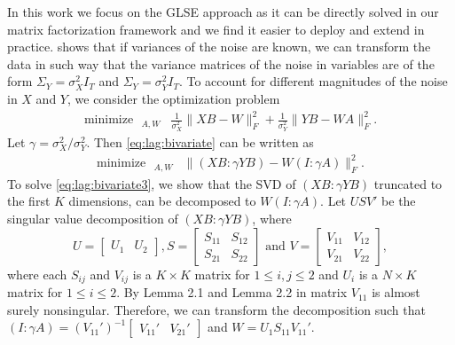\documentclass[preprint]{imsart}
\numberwithin{equation}{section}
\theoremstyle{plain}
\DeclareMathOperator*{\rank}{rank}
\DeclareMathOperator*{\minimize}{minimize\ \ }
\DeclareMathOperator*{\subjectto}{subject\ to\ \ }
\begin{document}
In this work we focus on the GLSE approach as it can be directly solved in our matrix factorization framework and we find it easier to deploy and extend in practice. \cite{gleser1981estimation} shows that if variances of the noise are known, we can transform the data in such way that the variance matrices of the noise in variables are of the form $\Sigma_Y = \sigma^2_XI_T$ and $\Sigma_Y = \sigma^2_YI_T$. To account for different magnitudes of the noise in $X$ and $Y$, we consider the optimization problem
\begin{align}\label{eq:lag:bivariate}
  \minimize_{A,W} & \frac{1}{\sigma_X^2}\|XB - W \|_F^2 + \frac{1}{\sigma_Y^2} \| YB - WA \|_F^2.
\end{align}
Let $\gamma = \sigma_X^2 / \sigma_Y^2$. Then \eqref{eq:lag:bivariate} can be written as
\begin{align}\label{eq:lag:bivariate3}
  \minimize_{A,W} & \| (XB : \gamma YB) - W(I: \gamma A) \|_F^2.%
\end{align}
To solve \eqref{eq:lag:bivariate3}, we show that the SVD of $(XB : \gamma YB)$ truncated to the first $K$ dimensions, can be decomposed to $W(I: \gamma A)$. Let $USV'$ be the singular value decomposition of $(XB : \gamma YB)$, where
\[
U = \begin{bmatrix}
  U_1 & U_2
\end{bmatrix},
S = \begin{bmatrix}
      S_{11} & S_{12}\\
      S_{21} & S_{22}
\end{bmatrix} 
\text{ and }
V = \begin{bmatrix}
      V_{11} & V_{12}\\
      V_{21} & V_{22}
    \end{bmatrix},
\]
where each $S_{ij}$ and $V_{ij}$ is a $K\times K$ matrix for $1 \leq i,j \leq 2$ and $U_i$ is a $N \times K$ matrix for $1 \leq i \leq 2$. By Lemma 2.1 and Lemma 2.2 in \citep{gleser1981estimation} matrix $V_{11}$ is almost surely nonsingular. Therefore, we can transform the decomposition such that $(I : \gamma A) = (V_{11}')^{-1}\begin{bmatrix}V_{11}' & V_{21}'\end{bmatrix}$ and $W = U_1 S_{11} V_{11}'$.
\end{document}

